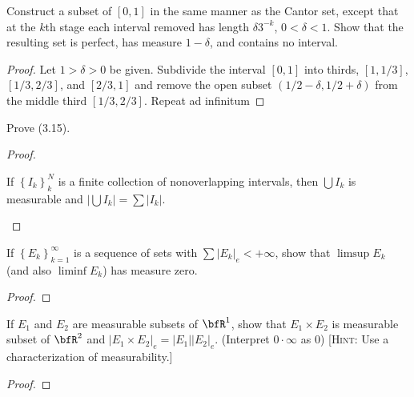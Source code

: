 \begin{problem}
Construct a subset of $[0,1]$ in the same manner as the Cantor set, except
that at the $k$th stage each interval removed has length $\delta 3^{-k}$,
$0<\delta<1$. Show that the resulting set is perfect, has measure
$1-\delta$, and contains no interval.
\end{problem}
\begin{proof}
Let $1>\delta>0$ be given. Subdivide the interval $[0,1]$ into thirds,
$\left[1,1/3\right]$, $\left[1/3,2/3\right]$, and $\left[2/3,1\right]$ and
remove the open subset $\left(1/2-\delta,1/2+\delta\right)$ from the middle
third $\left[1/3,2/3\right]$. Repeat ad infinitum
\end{proof}
\newpage

\begin{problem}
Prove (3.15).
\end{problem}
\begin{proof}
\begin{lemma*}
If $\left\{I_k\right\}_k^N$ is a finite collection of nonoverlapping
intervals, then $\bigcup I_k$ is measurable and $\left|\bigcup
  I_k\right|=\sum\left|I_k\right|$.
\end{lemma*}
\end{proof}
\newpage

\begin{problem}
If $\left\{E_k\right\}_{k=1}^\infty$ is a sequence of sets with
$\sum\left|E_k\right|_e<+\infty$, show that $\limsup E_k$ (and
also $\liminf E_k$) has measure zero.
\end{problem}
\begin{proof}
\end{proof}
\newpage

\begin{problem}
If $E_1$ and $E_2$ are measurable subsets of $\bfR^1$, show that $E_1\times
E_2$ is measurable subset of $\bfR^2$ and $\left|E_1\times
  E_2\right|_e=\left|E_1\right|\left|E_2\right|_e$. (Interpret
$0\cdot\infty$ as $0$) [\textsc{Hint:} Use a characterization of
measurability.]
\end{problem}
\begin{proof}
\end{proof}
\newpage

